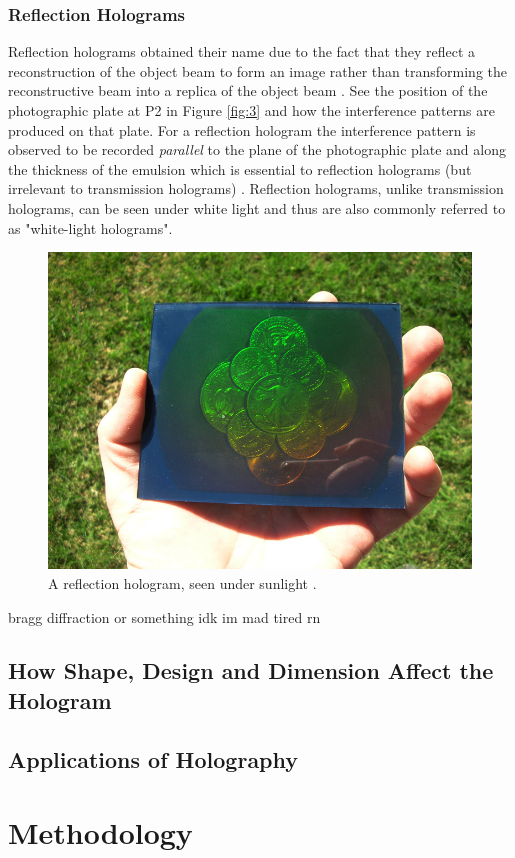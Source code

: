 \documentclass[12pt]{article}
\begin{document}
\subsubsection{Reflection Holograms}

Reflection holograms obtained their name due to the fact that they reflect a reconstruction of the object beam to form an image rather than transforming the reconstructive beam into a replica of the object beam \cite{princetonholo}.
See the position of the photographic plate at P2 in Figure \ref{fig:3} and how the interference patterns are produced on that plate.
For a reflection hologram the interference pattern is observed to be recorded \textit{parallel} to the plane of the photographic plate and along the thickness of the emulsion which is essential to reflection holograms (but irrelevant to transmission holograms) \cite{princetonholo}.
Reflection holograms, unlike transmission holograms, can be seen under white light and thus are also commonly referred to as "white-light holograms".

\begin{figure}[H]
    \centering
    \includegraphics[width=.5\textwidth]{reflection hologram.jpg}
    \caption{\centering A reflection hologram, seen under sunlight \protect\cite{reftransholo}.}
    \label{fig:8}
\end{figure}

bragg diffraction or something idk im mad tired rn

\subsection{How Shape, Design and Dimension Affect the Hologram}


\subsection{Applications of Holography}




\section{Methodology} \label{sec:2}
\end{document}
